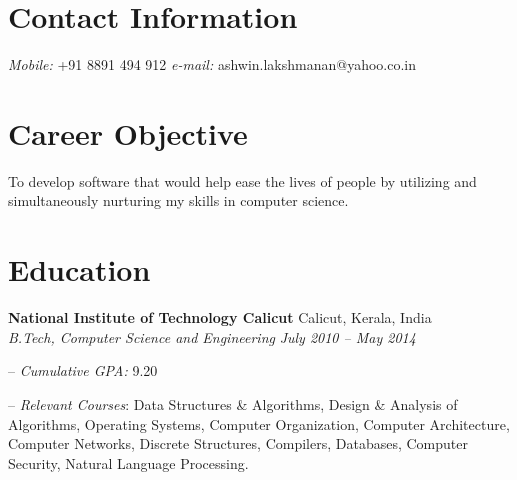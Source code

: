 \documentclass[margin,line]{resume}
\begin{document}


\begin{resume}

    \section{\mysidestyle Contact Information}
    
    
    \textit{Mobile:} +91 8891 494 912    \hfill    \textit{e-mail:} ashwin.lakshmanan@yahoo.co.in
        
      \vspace{+0.5mm}
	
	
    \section{\mysidestyle Career Objective}

        To develop software that would help ease the lives of people by utilizing and simultaneously nurturing my skills in computer science.

										
    \section{\mysidestyle Education}

    \textbf{National Institute of Technology Calicut} \hfill Calicut, Kerala, India
    \\
    \textit{B.Tech, Computer Science and Engineering} \hfill \textit{ July 2010 -- May 2014}
    
    \begin{compactitem}
        \item[--] \textit{Cumulative GPA:} 9.20 
        \item[--] \textit{Relevant Courses}: Data Structures \& Algorithms, Design \& Analysis of Algorithms, Operating Systems, Computer Organization, Computer Architecture, Computer Networks, Discrete Structures, Compilers, Databases, Computer Security, Natural Language Processing.
    \end{compactitem}
    

\end{resume}
\end{document}
